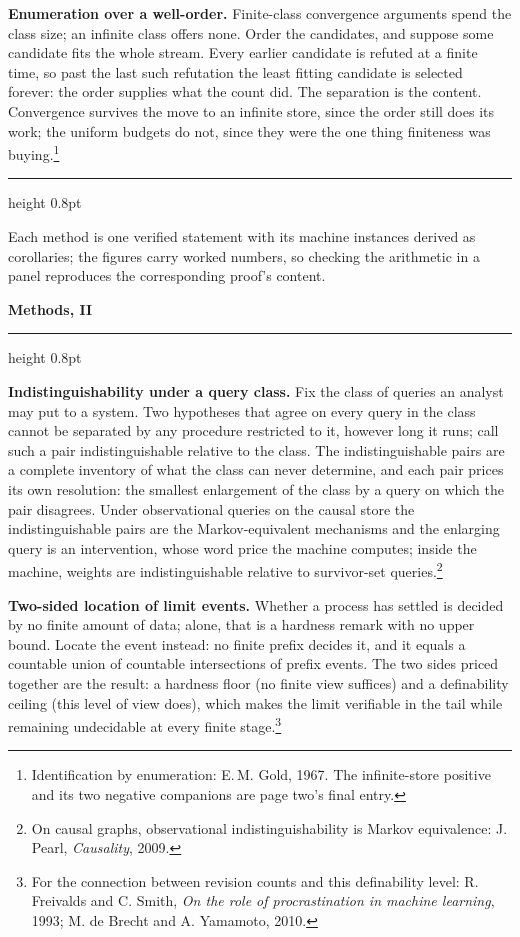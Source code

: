 \documentclass[10pt,a4paper]{article}
\begin{document}
\textbf{Enumeration over a well-order.} Finite-class convergence arguments spend the class size; an infinite class offers none. Order the candidates, and suppose some candidate fits the whole stream. Every earlier candidate is refuted at a finite time, so past the last such refutation the least fitting candidate is selected forever: the order supplies what the count did. The separation is the content. Convergence survives the move to an infinite store, since the order still does its work; the uniform budgets do not, since they were the one thing finiteness was buying.\footnote{Identification by enumeration: E.\,M. Gold, 1967. The infinite-store positive and its two negative companions are page two's final entry.}

\normalsize
\vfill
{\color{ink}\hrule height 0.8pt}
\vspace{2pt}
{\scriptsize\color{grey} Each method is one verified statement with its machine instances derived as corollaries; the figures carry worked numbers, so checking the arithmetic in a panel reproduces the corresponding proof's content.}

\newpage
\begin{center}
{\LARGE\bfseries Methods, II}
\end{center}
\vspace{1pt}
{\color{ink}\hrule height 0.8pt}
\vspace{4pt}
\small
\textbf{Indistinguishability under a query class.} Fix the class of queries an analyst may put to a system. Two hypotheses that agree on every query in the class cannot be separated by any procedure restricted to it, however long it runs; call such a pair indistinguishable relative to the class. The indistinguishable pairs are a complete inventory of what the class can never determine, and each pair prices its own resolution: the smallest enlargement of the class by a query on which the pair disagrees. Under observational queries on the causal store the indistinguishable pairs are the Markov-equivalent mechanisms and the enlarging query is an intervention, whose word price the machine computes; inside the machine, weights are indistinguishable relative to survivor-set queries.\footnote{On causal graphs, observational indistinguishability is Markov equivalence: J. Pearl, \emph{Causality}, 2009.}

\textbf{Two-sided location of limit events.} Whether a process has settled is decided by no finite amount of data; alone, that is a hardness remark with no upper bound. Locate the event instead: no finite prefix decides it, and it equals a countable union of countable intersections of prefix events. The two sides priced together are the result: a hardness floor (no finite view suffices) and a definability ceiling (this level of view does), which makes the limit verifiable in the tail while remaining undecidable at every finite stage.\footnote{For the connection between revision counts and this definability level: R. Freivalds and C. Smith, \emph{On the role of procrastination in machine learning}, 1993; M. de Brecht and A. Yamamoto, 2010.}
\end{document}
